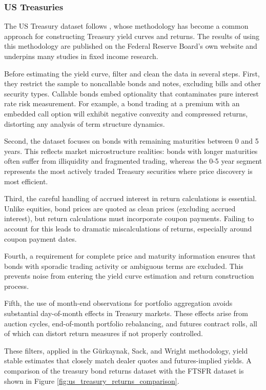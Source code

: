 \documentclass{article}
\begin{document}
\begin{appendices}
\subsubsection{US Treasuries}
\label{sec:treasuries}

The US Treasury dataset follows \cite{Gurkaynak2007}, whose methodology has become a common approach for constructing Treasury yield curves and returns. The results of using this methodology are published on the Federal Reserve Board's own website and underpins many studies in fixed income research.

Before estimating the yield curve, \citet{Gurkaynak2007} filter and clean the data in several steps. First, they restrict the sample to noncallable bonds and notes, excluding bills and other security types. Callable bonds embed optionality that contaminates pure interest rate risk measurement. For example, a bond trading at a premium with an embedded call option will exhibit negative convexity and compressed returns, distorting any analysis of term structure dynamics.

Second, the dataset focuses on bonds with remaining maturities between 0 and 5 years. This reflects market microstructure realities: bonds with longer maturities often suffer from illiquidity and fragmented trading, whereas the 0-5 year segment represents the most actively traded Treasury securities where price discovery is most efficient.

Third, the careful handling of accrued interest in return calculations is essential. Unlike equities, bond prices are quoted as clean prices (excluding accrued interest), but return calculations must incorporate coupon payments. Failing to account for this leads to dramatic miscalculations of returns, especially around coupon payment dates.

Fourth, a requirement for complete price and maturity information ensures that bonds with sporadic trading activity or ambiguous terms are excluded. This prevents noise from entering the yield curve estimation and return construction process.

Fifth, the use of month-end observations for portfolio aggregation avoids substantial day-of-month effects in Treasury markets. These effects arise from auction cycles, end-of-month portfolio rebalancing, and futures contract rolls, all of which can distort return measures if not properly controlled.

These filters, applied in the Gürkaynak, Sack, and Wright methodology, yield stable estimates that closely match dealer quotes and futures-implied yields. A comparison of the treasury bond returns dataset with the FTSFR dataset is shown in Figure \ref{fig:us_treasury_returns_comparison}.


\end{appendices}
\end{document}
